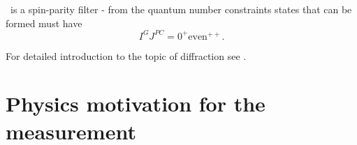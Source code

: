 \DPE\ is a spin-parity filter - from the quantum number constraints states that can be formed must have
\begin{equation}\label{eq:DPE_IGJPC}
 I^{G}J^{PC}=0^{+}\textrm{even}^{++}.
\end{equation}

For detailed introduction to the topic of diffraction see \cite{pomeronAndQCD,barone}.

\section{Physics motivation for the measurement}